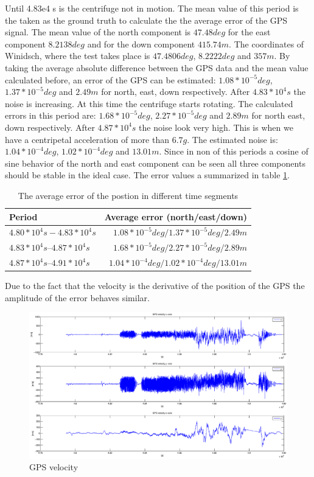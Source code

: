 Until 4.83e4 s is the centrifuge not in motion. The mean value of this period is the taken as the ground truth to calculate the the average error of the GPS signal. The mean value of the north component is $47.48 deg$ for the east component $8.2138 deg$ and for the down component $415.74 m$. The coordinates of Winidsch, where the test takes place is $47.4806 deg$, $8.2222 deg$ and $357 m$. By taking the average absolute difference between the GPS data and the mean value calculated before, an error of the GPS can be estimated: $1.08*10^{-5} deg$, $1.37*10^{-5}deg$ and $2.49 m$ for north, east, down respectively. After $4.83*10^{4} s$ the noise is increasing. At this time the centrifuge starts rotating. The calculated  errors in this period are: $1.68*10^{-5} deg$, $2.27*10^{-5} deg$ and $2.89 m$ for north east, down respectively. After $4.87*10^{4} s$ the noise look very high. This is when we have  a centripetal acceleration of more than  $6.7 g$. The estimated noise is: $1.04*10^{-4} deg$, $1.02*10^{-4} deg$ and $13.01 m$. Since in non of this periods a cosine of sine behavior of the north and east component can be seen all three components should be stable in the ideal case. The error values a summarized in table \ref{ct_pos_error}.
\begin{table}[h]
\centering
\begin{tabular}{|l|r|}
\hline
Period & Average error (north/east/down) \\
\hline
$4.80*10^{4} s - 4.83*10^{4} s$&$1.08*10^{-5} deg / 1.37*10^{-5} deg / 2.49 m$\\
\hline
$4.83*10^{4} s – 4.87*10^{4} s$&$1.68*10^{-5} deg / 2.27*10^{-5} deg / 2.89 m$\\
\hline
$4.87*10^{4} s – 4.91*10^{4} s$&$1.04*10^{-4} deg/ 1.02*10^{-4} deg / 13.01 m$\\
\hline
\end{tabular}
\caption{The average error of the postion in different time segments}
\label{ct_pos_error}
\end{table}
Due to the fact that the velocity is the derivative of the position of the GPS the amplitude of the error behaves  similar.
\begin{figure}[h]
\centering
\includegraphics[width=1.2\textwidth]{pictures/ct_vel.eps}
\caption{GPS velocity}
\label{ct_vel}
\end{figure}
